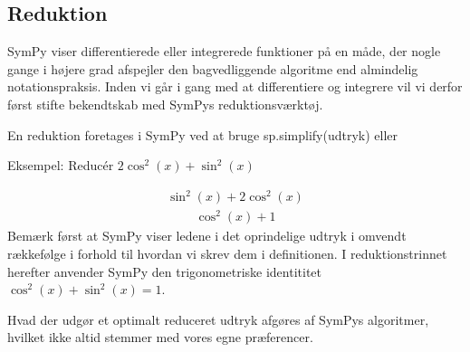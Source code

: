 \documentclass[letterpaper,10pt,english]{jupyterBook}
\begin{document}
\subsection{Reduktion}
\label{\detokenize{notebooks/sympy/Notebook4:reduktion}}
SymPy viser differentierede eller integrerede funktioner på en måde, der nogle gange i højere grad afspejler den bagvedliggende algoritme end almindelig notationspraksis. Inden vi går i gang med at differentiere og integrere vil vi derfor først stifte bekendtskab med SymPys reduktions\sphinxhyphen{}værktøj.

En reduktion foretages i SymPy ved at bruge sp.simplify(udtryk) eller 

Eksempel: Reducér \(2\cos^2(x) + \sin^2(x)\)

\begin{sphinxVerbatim}[commandchars=\\\{\}]
          

  
\end{sphinxVerbatim}
\begin{equation*}
\begin{split}\displaystyle \sin^{2}{\left(x \right)} + 2 \cos^{2}{\left(x \right)}\end{split}
\end{equation*}\begin{equation*}
\begin{split}\displaystyle \cos^{2}{\left(x \right)} + 1\end{split}
\end{equation*}
Bemærk først at SymPy viser ledene i det oprindelige udtryk i omvendt rækkefølge i forhold til hvordan vi skrev dem i definitionen. I reduktionstrinnet herefter anvender SymPy den trigonometriske identititet \(\cos^2(x) + \sin^2(x) = 1\).

Hvad der udgør et optimalt reduceret udtryk afgøres af SymPys algoritmer, hvilket ikke altid stemmer med vores egne præferencer.
\end{document}
